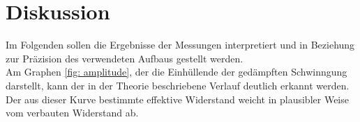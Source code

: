 \section{Diskussion}
Im Folgenden sollen die Ergebnisse der Messungen interpretiert und in Beziehung zur Präzision des verwendeten Aufbaus gestellt werden. \\
Am Graphen \ref{fig: amplitude}, der die Einhüllende der gedämpften Schwinngung darstellt, kann der in der Theorie beschriebene Verlauf deutlich erkannt werden.
Der aus dieser Kurve bestimmte effektive Widerstand weicht in plausibler Weise vom verbauten Widerstand ab.   
